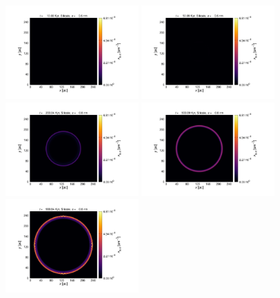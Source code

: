 \documentclass[fleqn,usenatbib]{mnras}
\begin{document}
\begin{figure}
  \includegraphics[trim=2.8cm 1.5cm 9.3cm 2.0cm, clip=true,page=3,height = 3.6cm]{Pics/Pics_A2/Density_1_00041.pdf}\hspace*{-0.05cm} 
 \includegraphics[trim=5.2cm 1.5cm 9.3cm 2.0cm, clip=true,page=3,height = 3.6cm]{Pics/Pics_A2/Density_1_00201.pdf}\hspace*{-0.05cm} 
 \includegraphics[trim=5.2cm 1.5cm 9.3cm 2.0cm, clip=true,page=3,height = 3.6cm]{Pics/Pics_A2/Density_1_00801.pdf}\hspace*{-0.05cm}
 \includegraphics[trim=5.2cm 1.5cm 9.3cm 2.0cm, clip=true,page=3,height = 3.6cm]{Pics/Pics_A2/Density_1_02001.pdf}\hspace*{-0.05cm} 
 \includegraphics[trim=5.2cm 1.5cm 3.2cm 2.0cm, clip=true,page=3,height = 3.6cm]{Pics/Pics_A2/Density_1_04000.pdf}\\

\end{figure}
\end{document}
